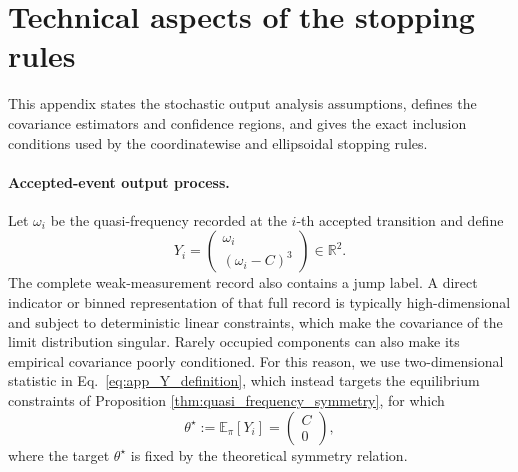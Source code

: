 \documentclass[showpacs,amsmath,amssymb,twocolumn,prx,superscriptaddress,10pt,aps,nofootinbib]{revtex4-2}
\begin{document}


\section{Technical aspects of the stopping rules}
\label{app:stopping_rule_details}

This appendix states the stochastic output analysis assumptions, defines the covariance estimators and confidence regions, and gives the exact inclusion conditions used by the coordinatewise and ellipsoidal stopping rules.

\paragraph{Accepted-event output process.}
Let $\omega_i$ be the quasi-frequency recorded at the $i$-th accepted transition and define
\begin{equation}
\label{eq:app_Y_definition}
    Y_i
    =
    \begin{pmatrix}
        \omega_i\\
        (\omega_i-C)^3
    \end{pmatrix}
    \in\mathbb R^2.
\end{equation}
The complete weak-measurement record also contains a jump label. A direct indicator or binned representation of that full record is typically high-dimensional and subject to deterministic linear constraints, which make the covariance of the limit distribution singular. Rarely occupied components can also make its empirical covariance poorly conditioned. For this reason, we use two-dimensional statistic in Eq.~\eqref{eq:app_Y_definition}, which instead targets the equilibrium constraints of Proposition \ref{thm:quasi_frequency_symmetry}, for which
\begin{equation}
\label{eq:app_theta_target}
    \theta^\star
    :=
    \mathbb E_\pi[Y_i]
    =
    \begin{pmatrix}
        C\\
        0
    \end{pmatrix},
\end{equation}
where the target $\theta^\star$ is fixed by the theoretical symmetry relation.
\end{document}

